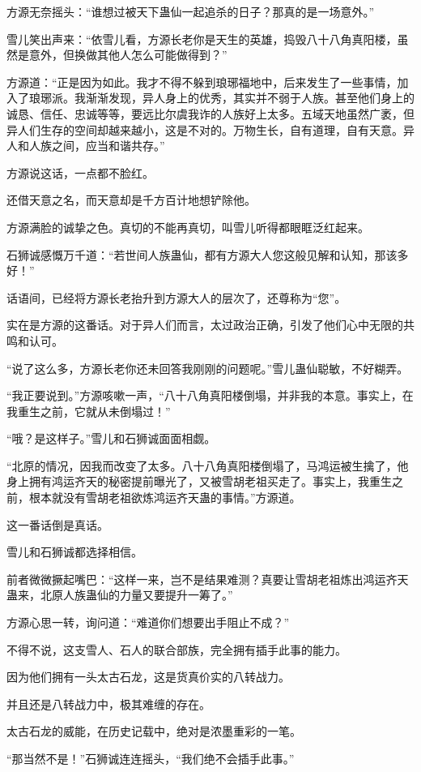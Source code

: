\begin{this_body}
方源无奈摇头：“谁想过被天下蛊仙一起追杀的日子？那真的是一场意外。”

雪儿笑出声来：“依雪儿看，方源长老你是天生的英雄，捣毁八十八角真阳楼，虽然是意外，但换做其他人怎么可能做得到？”

方源道：“正是因为如此。我才不得不躲到琅琊福地中，后来发生了一些事情，加入了琅琊派。我渐渐发现，异人身上的优秀，其实并不弱于人族。甚至他们身上的诚恳、信任、忠诚等等，要远比尔虞我诈的人族好上太多。五域天地虽然广袤，但异人们生存的空间却越来越小，这是不对的。万物生长，自有道理，自有天意。异人和人族之间，应当和谐共存。”

方源说这话，一点都不脸红。

还借天意之名，而天意却是千方百计地想铲除他。

方源满脸的诚挚之色。真切的不能再真切，叫雪儿听得都眼眶泛红起来。

石狮诚感慨万千道：“若世间人族蛊仙，都有方源大人您这般见解和认知，那该多好！”

话语间，已经将方源长老抬升到方源大人的层次了，还尊称为“您”。

实在是方源的这番话。对于异人们而言，太过政治正确，引发了他们心中无限的共鸣和认可。

“说了这么多，方源长老你还未回答我刚刚的问题呢。”雪儿蛊仙聪敏，不好糊弄。

“我正要说到。”方源咳嗽一声，“八十八角真阳楼倒塌，并非我的本意。事实上，在我重生之前，它就从未倒塌过！”

“哦？是这样子。”雪儿和石狮诚面面相觑。

“北原的情况，因我而改变了太多。八十八角真阳楼倒塌了，马鸿运被生擒了，他身上拥有鸿运齐天的秘密提前曝光了，又被雪胡老祖买走了。事实上，我重生之前，根本就没有雪胡老祖欲炼鸿运齐天蛊的事情。”方源道。

这一番话倒是真话。

雪儿和石狮诚都选择相信。

前者微微撅起嘴巴：“这样一来，岂不是结果难测？真要让雪胡老祖炼出鸿运齐天蛊来，北原人族蛊仙的力量又要提升一筹了。”

方源心思一转，询问道：“难道你们想要出手阻止不成？”

不得不说，这支雪人、石人的联合部族，完全拥有插手此事的能力。

因为他们拥有一头太古石龙，这是货真价实的八转战力。

并且还是八转战力中，极其难缠的存在。

太古石龙的威能，在历史记载中，绝对是浓墨重彩的一笔。

“那当然不是！”石狮诚连连摇头，“我们绝不会插手此事。”


\end{this_body}
